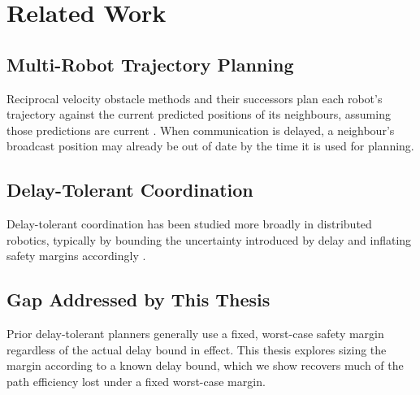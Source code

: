 \chapter{Related Work}
\label{ch:related}

\section{Multi-Robot Trajectory Planning}
Reciprocal velocity obstacle methods and their successors plan each
robot's trajectory against the current predicted positions of its
neighbours, assuming those predictions are current \citep{VanDenBerg2011}.
When communication is delayed, a neighbour's broadcast position may already
be out of date by the time it is used for planning.

\section{Delay-Tolerant Coordination}
Delay-tolerant coordination has been studied more broadly in distributed
robotics, typically by bounding the uncertainty introduced by delay and
inflating safety margins accordingly \citep{Zhou2017}.

\section{Gap Addressed by This Thesis}
Prior delay-tolerant planners generally use a fixed, worst-case safety
margin regardless of the actual delay bound in effect. This thesis
explores sizing the margin according to a known delay bound, which we
show recovers much of the path efficiency lost under a fixed worst-case
margin.
